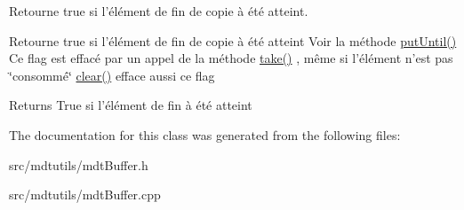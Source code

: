 Retourne true si l'élément de fin de copie à été atteint. 

Retourne true si l'élément de fin de copie à été atteint Voir la méthode \hyperlink{classmdt_buffer_a01d74092785c9442014ee34624ffa96f}{putUntil()} Ce flag est effacé par un appel de la méthode \hyperlink{classmdt_buffer_ad4756dea3500741363092d5a85ef858e}{take()} , même si l'élément n'est pas \char`\"{}consommé\char`\"{} \hyperlink{classmdt_buffer_a697920838a6c786209607c2b6ac0858a}{clear()} efface aussi ce flag

\begin{DoxyReturn}{Returns}
True si l'élément de fin à été atteint 
\end{DoxyReturn}


The documentation for this class was generated from the following files:\begin{DoxyCompactItemize}
\item 
src/mdtutils/mdtBuffer.h\item 
src/mdtutils/mdtBuffer.cpp\end{DoxyCompactItemize}
